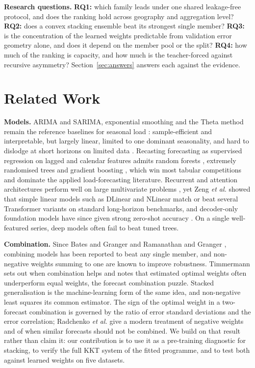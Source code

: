 \documentclass[journal]{IEEEtran}
\begin{document}
\textbf{Research questions.} \textbf{RQ1:} which family leads under one shared leakage-free protocol, and does the ranking hold across geography and aggregation level? \textbf{RQ2:} does a convex stacking ensemble beat its strongest single member? \textbf{RQ3:} is the concentration of the learned weights predictable from validation error geometry alone, and does it depend on the member pool or the split? \textbf{RQ4:} how much of the ranking is capacity, and how much is the teacher-forced against recursive asymmetry? Section~\ref{sec:answers} answers each against the evidence.

\section{Related Work}
\textbf{Models.} ARIMA and SARIMA, exponential smoothing and the Theta method remain the reference baselines for seasonal load \cite{r6}: sample-efficient and interpretable, but largely linear, limited to one dominant seasonality, and hard to dislodge at short horizons on limited data \cite{r12}. Recasting forecasting as supervised regression on lagged and calendar features admits random forests \cite{r7}, extremely randomised trees \cite{r8} and gradient boosting \cite{r9,r10,r11}, which win most tabular competitions \cite{r12} and dominate the applied load-forecasting literature. Recurrent and attention architectures perform well on large multivariate problems \cite{r3,r5,r16}, yet Zeng \emph{et al.} \cite{r15} showed that simple linear models such as DLinear and NLinear match or beat several Transformer variants on standard long-horizon benchmarks, and decoder-only foundation models have since given strong zero-shot accuracy \cite{r14}. On a single well-featured series, deep models often fail to beat tuned trees.

\textbf{Combination.} Since Bates and Granger \cite{r32} and Ramanathan and Granger \cite{r4}, combining models has been reported to beat any single member, and non-negative weights summing to one are known to improve robustness. Timmermann \cite{r17} sets out when combination helps and notes that estimated optimal weights often underperform equal weights, the forecast combination puzzle. Stacked generalisation \cite{r18,r19} is the machine-learning form of the same idea, and non-negative least squares \cite{r20} its common estimator. The sign of the optimal weight in a two-forecast combination is governed by the ratio of error standard deviations and the error correlation; Radchenko \emph{et al.} \cite{r33} give a modern treatment of negative weights and of when similar forecasts should not be combined. We build on that result rather than claim it: our contribution is to use it as a pre-training diagnostic for stacking, to verify the full KKT system of the fitted programme, and to test both against learned weights on five datasets.
\end{document}
